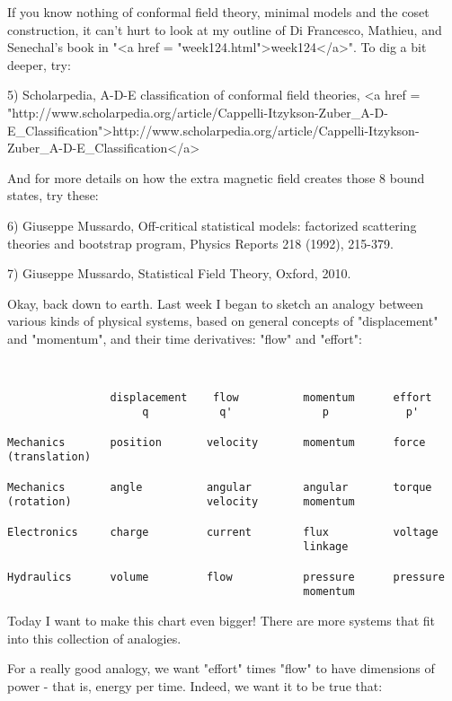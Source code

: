 If you know nothing of conformal field theory, minimal models and the
coset construction, it can't hurt to look at my outline of Di
Francesco, Mathieu, and Senechal's book in "<a href =
"week124.html">week124</a>".  To dig a bit deeper, try:

5) Scholarpedia, A-D-E classification of conformal field theories,
<a href = "http://www.scholarpedia.org/article/Cappelli-Itzykson-Zuber_A-D-E_Classification">http://www.scholarpedia.org/article/Cappelli-Itzykson-Zuber_A-D-E_Classification</a>
 
And for more details on how the extra magnetic field creates those 8
bound states, try these:

6) Giuseppe Mussardo, Off-critical statistical models: factorized
scattering theories and bootstrap program, Physics Reports 218
(1992), 215-379.  

7) Giuseppe Mussardo, Statistical Field Theory, Oxford, 2010.

Okay, back down to earth.  Last week I began to sketch an analogy
between various kinds of physical systems, based on general concepts
of "displacement" and "momentum", and their time
derivatives: "flow" and "effort":



\begin{verbatim}


                displacement    flow          momentum      effort
                     q           q'              p            p'

Mechanics       position       velocity       momentum      force
(translation)

Mechanics       angle          angular        angular       torque
(rotation)                     velocity       momentum

Electronics     charge         current        flux          voltage
                                              linkage

Hydraulics      volume         flow           pressure      pressure
                                              momentum

\end{verbatim}
    

Today I want to make this chart even bigger!  There are more systems that
fit into this collection of analogies.

For a really good analogy, we want "effort" times
"flow" to have dimensions of power - that is, energy per
time.  Indeed, we want it to be true that:

